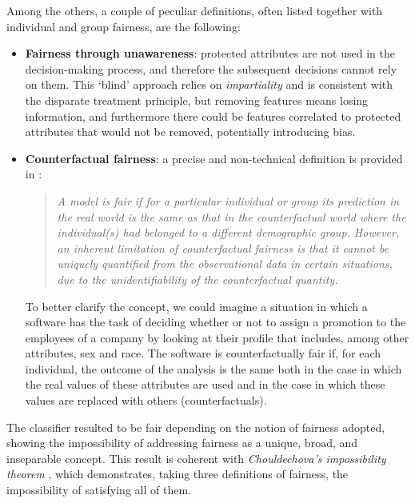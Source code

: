 Among the others, a couple of peculiar definitions, often listed together with individual and group fairness, are the following:
\begin{itemize}
\item \textbf{Fairness through unawareness}: protected attributes are not used in the decision-making process, and therefore the subsequent decisions cannot rely on them. This `blind' approach relies on \textit{impartiality} and is consistent with the disparate treatment principle, but removing features means losing information, and furthermore there could be features correlated to protected attributes that would not be removed, potentially introducing bias.
\item \textbf{Counterfactual fairness}: a precise and non-technical definition is provided in \cite{wu2019counterfactual}:
\begin{quote}\emph{A model is fair if for a particular individual or group its prediction in the real world is the same as that in the counterfactual world where the individual(s) had belonged to a different demographic group. However, an inherent limitation of counterfactual fairness is that it cannot be uniquely quantified from the observational data in certain situations, due to the unidentifiability of the counterfactual quantity.} \cite[p.~1]{wu2019counterfactual}\end{quote}
To better clarify the concept, we could imagine a situation in which a software has the task of deciding whether or not to assign a promotion to the employees of a company by looking at their profile that includes, among other attributes, sex and race. The software is counterfactually fair if, for each individual, the outcome of the analysis is the same both in the case in which the real values of these attributes are used and in the case in which these values are replaced with others (counterfactuals).
\end{itemize}

The classifier resulted to be fair depending on the notion of fairness adopted, showing the impossibility of addressing fairness as a unique, broad, and inseparable concept. This result is coherent with \textit{Chouldechova's impossibility theorem} \cite{chouldechova2017fair}, which demonstrates, taking three definitions of fairness, the impossibility of satisfying all of them.
